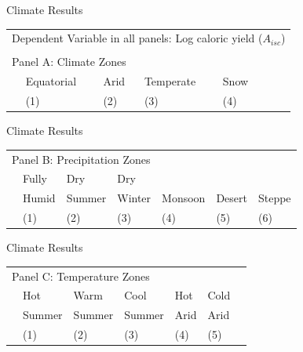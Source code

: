 \documentclass[10pt, xcolor=dvipsnames]{beamer}
\begin{document}
\begin{frame}{Climate Results}\label{climatereg}

{\footnotesize
\begin{tabularx}{\textwidth}{lXXXXXX}
\midrule
\multicolumn{7}{l}{Dependent Variable in all panels: Log caloric yield ($A_{isc}$)} \\ \\
\multicolumn{7}{l}{Panel A: Climate Zones} \\
 & Equatorial & Arid & Temperate & Snow  &     &   \\
 & (1) & (2) & (3) & (4) &  & \\
\midrule

\midrule
\end{tabularx}
}

\hfill \hyperlink{climate}{}
\end{frame}

\begin{frame}{Climate Results}

{\footnotesize
\begin{tabularx}{\textwidth}{lXXXXXX}
\midrule
\multicolumn{7}{l}{Panel B: Precipitation Zones} \\
& Fully     & Dry         & Dry        &              &            & \\
& Humid & Summer & Winter & Monsoon & Desert & Steppe \\
 & (1) & (2) & (3) & (4) & (5) & (6) \\
\midrule

\midrule
\end{tabularx}
}

\end{frame}

\begin{frame}{Climate Results}

{\footnotesize
\begin{tabularx}{\textwidth}{lXXXXXX}
\midrule
\multicolumn{7}{l}{Panel C: Temperature Zones} \\
    & Hot        & Warm        & Cool       & Hot      & Cold     &  \\
    & Summer & Summer & Summer & Arid & Arid &   \\
 & (1) & (2) & (3) & (4) & (5) &  \\    
\midrule

\midrule
\end{tabularx}
}
\end{frame}
\end{document}
